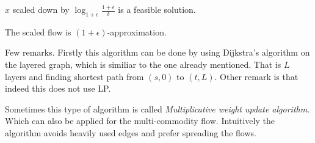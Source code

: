 \begin{lemma}
	$x$ scaled down by $\log_{1 + \epsilon} \frac{1+\epsilon}{\delta}$ is a feasible solution.
\end{lemma}

\begin{thm}
	The scaled flow is $(1 + \epsilon)$-approximation.
\end{thm}

Few remarks. Firstly this algorithm can be done by using Dijkstra's algorithm on the layered graph, which is similiar to the one already mentioned. That is $L$ layers and finding shortest path from $(s,0)$ to $(t, L)$. Other remark is that indeed this does not use LP.

Sometimes this type of algorithm is called \textit{Multiplicative weight update algorithm}. Which can also be applied for the multi-commodity flow. Intuitively the algorithm avoids heavily used edges and prefer spreading the flows.